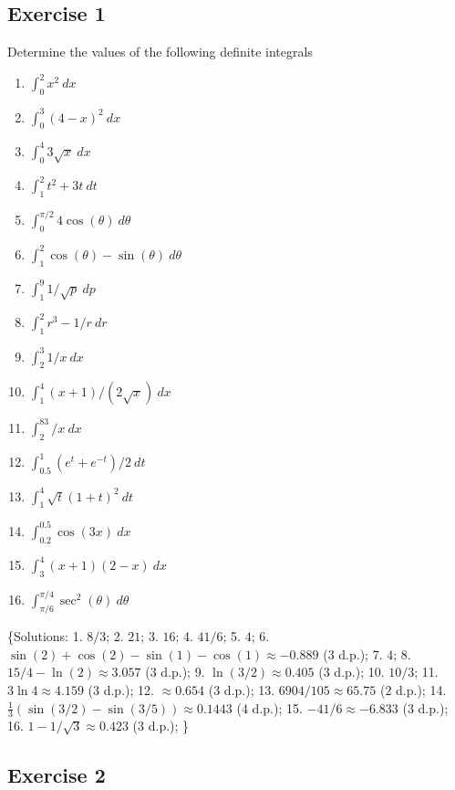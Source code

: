 \documentclass[
  english,
  11pt,
  oneside]{book}
\providecommand{\tightlist}{%
  \setlength{\itemsep}{0pt}\setlength{\parskip}{0pt}}
\newcommand{\slide}{}
\theoremstyle{definition}
\theoremstyle{definition}
\theoremstyle{definition}
\theoremstyle{definition}
\theoremstyle{remark}
\begin{document}
\subsection*{Exercise 1}\label{exercise-1-6}

Determine the values of the following definite integrals

\begin{enumerate}
\def\labelenumi{\arabic{enumi}.}
\tightlist
\item
  \(\int_0^2 x^2\ dx\)
\item
  \(\int_0^3 (4-x)^2\ dx\)
\item
  \(\int_0^4 3\sqrt{x}\ dx\)
\item
  \(\int_1^2 t^2+3t\ dt\)
\item
  \(\int_0^{\pi/2}4\cos(\theta) \ d\theta\)
\item
  \(\int_1^2 \cos(\theta)-\sin(\theta)\ d\theta\)
\item
  \(\int_1^9 1/\sqrt{p}\ dp\)
\item
  \(\int_1^2 r^3-1/r\ dr\)
\item
  \(\int_2^3 1/x\ dx\)
\item
  \(\int_1^4 (x+1)/(2\sqrt{x})\ dx\)
\item
  \(\int_2^83/x \ dx\)
\item
  \(\int_{0.5}^1(e^t+e^{-t})/2 \ dt\)
\item
  \(\int_1^4 \sqrt{t}(1+t)^2 \ dt\)
\item
  \(\int_{0.2}^{0.5} \cos(3x)\ dx\)
\item
  \(\int_3^4 (x+1)(2-x)\ dx\)
\item
  \(\int_{\pi/6}^{\pi/4} \sec^2(\theta)\ d\theta\)
\end{enumerate}

\{Solutions:
1. \(8/3\);
2. \(21\);
3. \(16\);
4. \(41/6\);
5. \(4\);
6. \(\sin(2)+\cos(2)-\sin(1)-\cos(1) \approx -0.889\) (\(3\) d.p.);
7. \(4\);
8. \(15/4 - \ln(2) \approx 3.057\) (\(3\) d.p.);
9. \(\ln(3/2) \approx 0.405\) (\(3\) d.p.);
10. \(10/3\);
11. \(3\ln4 \approx 4.159\) (\(3\) d.p.);
12. \(\approx 0.654\) (\(3\) d.p.);
13. \(6904/105 \approx 65.75\) (\(2\) d.p.);
14. \(\frac{1}{3}(\sin(3/2)-\sin(3/5)) \approx 0.1443\) (\(4\) d.p.);
15. \(-41/6 \approx -6.833\) (\(3\) d.p.);
16. \(1-1/\sqrt{3} \approx 0.423\) (\(3\) d.p.);
\}

\slide

\subsection*{Exercise 2}\label{exercise-2-6}
\end{document}
